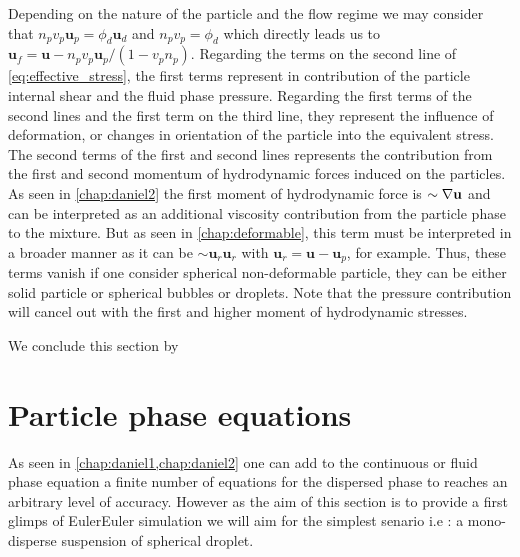 Depending on the nature of the particle and the flow regime we may consider that $n_pv_p\textbf{u}_p = \phi_d \textbf{u}_d$ and $n_pv_p = \phi_d$ which directly leads us to $\textbf{u}_f = \textbf{u}- n_pv_p \textbf{u}_p / (1 - v_pn_p)$. 
Regarding the terms on the second line of \ref{eq:effective_stress}, the first terms represent in contribution of the particle internal shear and the fluid phase pressure.
Regarding the first terms of the second lines and the first term on the third line, they represent the influence of deformation, or changes in orientation of the particle into the equivalent stress. 
The second terms of the first and second lines represents the contribution from the first and second momentum of hydrodynamic forces induced on the particles. 
As seen in \ref{chap:daniel2} the first moment of hydrodynamic force is $\sim \mathbf{\nabla} \textbf{u}$ and can be interpreted as an additional viscosity contribution from the particle phase to the mixture. 
But as seen in \ref{chap:deformable}, this term must be interpreted in a broader manner as it can be $\sim \textbf{u}_r \textbf{u}_r$ with $\textbf{u}_r = \textbf{u}- \textbf{u}_p$, for example.
Thus, these terms vanish if one consider spherical non-deformable particle, they can be either solid particle or spherical bubbles or droplets. 
Note that the pressure contribution will cancel out with the first and higher moment of hydrodynamic stresses. 

We conclude this section by 

\section{Particle phase equations}

As seen in \ref{chap:daniel1,chap:daniel2} one can add to the continuous or fluid phase equation a finite number of equations for the dispersed phase to reaches an arbitrary level of accuracy. 
However as the aim of this section is to provide a first glimps of EulerEuler simulation we will aim for the simplest senario i.e : a mono-disperse suspension of spherical droplet. 

